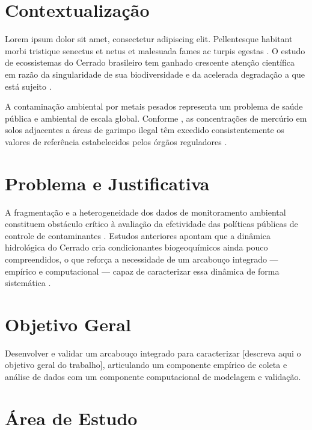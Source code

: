 \section{Contextualização}
\label{sec:contextualizacao}

Lorem ipsum dolor sit amet, consectetur adipiscing elit. Pellentesque
habitant morbi tristique senectus et netus et malesuada fames ac turpis
egestas \cite{exemplo:artigo:2024}. O estudo de ecossistemas do Cerrado
brasileiro tem ganhado crescente atenção científica em razão da
singularidade de sua biodiversidade e da acelerada degradação a que está
sujeito \cite{exemplo:livro:2020}.

A contaminação ambiental por metais pesados representa um problema de
saúde pública e ambiental de escala global. Conforme
, as concentrações de mercúrio em solos
adjacentes a áreas de garimpo ilegal têm excedido consistentemente os
valores de referência estabelecidos pelos órgãos reguladores
\cite{exemplo:relatorio:2021}.

\section{Problema e Justificativa}
\label{sec:problema}

A fragmentação e a heterogeneidade dos dados de monitoramento
ambiental constituem obstáculo crítico à avaliação da efetividade das
políticas públicas de controle de contaminantes
\cite{exemplo:capitulo:2019}. Estudos anteriores
\cite{exemplo:anais:2023} apontam que a dinâmica hidrológica do
Cerrado cria condicionantes biogeoquímicos ainda pouco compreendidos,
o que reforça a necessidade de um arcabouço integrado — empírico e
computacional — capaz de caracterizar essa dinâmica de forma
sistemática \cite{brasil:lei:2012}.

\section{Objetivo Geral}
\label{sec:objetivo-geral}

Desenvolver e validar um arcabouço integrado para caracterizar
[descreva aqui o objetivo geral do trabalho], articulando um
componente empírico de coleta e análise de dados com um componente
computacional de modelagem e validação.

\section{Área de Estudo}
\label{sec:area-estudo}

